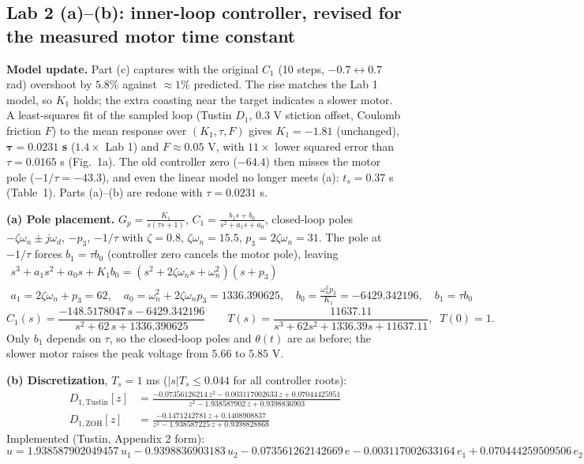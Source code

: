 \documentclass[10pt]{article}
\begin{document}
\subsection*{Lab 2 (a)--(b): inner-loop controller, revised for the measured motor time constant}

\textbf{Model update.} Part (c) captures with the original $C_1$ (10 steps,
$-0.7 \leftrightarrow 0.7$ rad) overshoot by $5.8\%$ against $\approx 1\%$
predicted. The rise matches the Lab 1 model, so $K_1$ holds; the extra coasting
near the target indicates a slower motor. A least-squares fit of the sampled
loop (Tustin $D_1$, $0.3$ V stiction offset, Coulomb friction $F$) to the mean
response over $(K_1, \tau, F)$ gives $K_1 = -1.81$ (unchanged),
$\boldsymbol{\tau = 0.0231}$ \textbf{s} ($1.4\times$ Lab 1) and $F \approx 0.05$ V,
with $11\times$ lower squared error than $\tau = 0.0165$ s (Fig.~1a). The old
controller zero ($-64.4$) then misses the motor pole ($-1/\tau = -43.3$), and
even the linear model no longer meets (a): $t_s = 0.37$ s (Table~1). Parts
(a)--(b) are redone with $\tau = 0.0231$ s.

\textbf{(a) Pole placement.} $G_p = \frac{K_1}{s(\tau s + 1)}$,
$C_1 = \frac{b_1 s + b_0}{s^2 + a_1 s + a_0}$, closed-loop poles
$-\zeta\omega_n \pm j\omega_d$, $-p_3$, $-1/\tau$ with $\zeta = 0.8$,
$\zeta\omega_n = 15.5$, $p_3 = 2\zeta\omega_n = 31$. The pole at $-1/\tau$ forces
$b_1 = \tau b_0$ (controller zero cancels the motor pole), leaving
\begin{gather*}
s^3 + a_1 s^2 + a_0 s + K_1 b_0 = (s^2 + 2\zeta\omega_n s + \omega_n^2)(s + p_3) \\
a_1 = 2\zeta\omega_n + p_3 = 62,\quad a_0 = \omega_n^2 + 2\zeta\omega_n p_3 = 1336.390625,\quad
b_0 = \frac{\omega_n^2 p_3}{K_1} = -6429.342196,\quad b_1 = \tau b_0
\end{gather*}
\[
\boxed{C_1(s) = \frac{-148.5178047\, s - 6429.342196}{s^2 + 62\, s + 1336.390625}}
\qquad
T(s) = \frac{11637.11}{s^3 + 62 s^2 + 1336.39 s + 11637.11},\;\; T(0) = 1 .
\]
Only $b_1$ depends on $\tau$, so the closed-loop poles and $\theta(t)$ are as
before; the slower motor raises the peak voltage from $5.66$ to $5.85$ V.

\textbf{(b) Discretization}, $T_s = 1$ ms ($|s| T_s \le 0.044$ for all controller roots):
\begin{align*}
D_{1,\text{Tustin}}[z] &= \frac{-0.07356126214\, z^2 - 0.003117002633\, z + 0.07044425951}{z^2 - 1.938587902\, z + 0.9398836903} \\
D_{1,\text{ZOH}}[z] &= \frac{-0.1471242781\, z + 0.1408908837}{z^2 - 1.938587225\, z + 0.9398828868}
\end{align*}
Implemented (Tustin, Appendix 2 form):
\[
u = 1.938587902049457\,u_1 - 0.9398836903183\,u_2 - 0.073561262142669\,e - 0.003117002633164\,e_1 + 0.070444259509506\,e_2
\]
\end{document}
